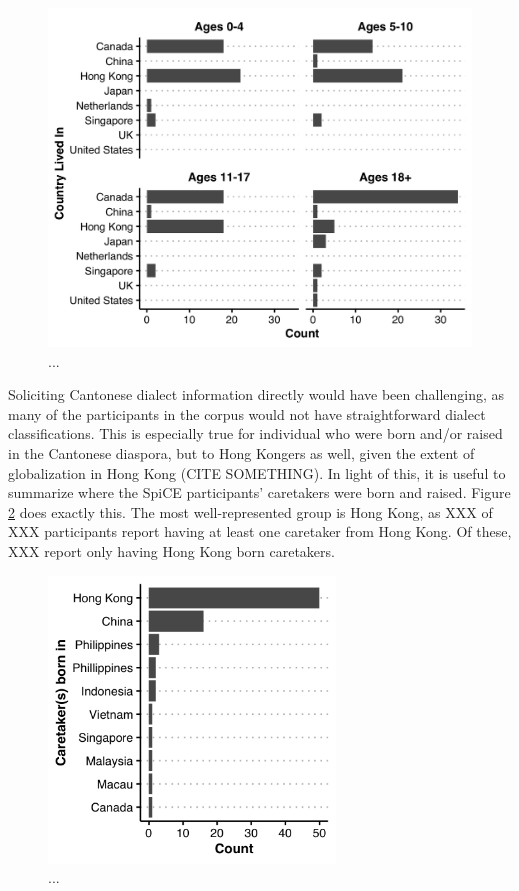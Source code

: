 \begin{figure}[!htbp]
  \begin{center}
  \includegraphics[width=5in]{figures/ch2_placeslived_5in.png} 
  \caption{...}
  \label{ch2:fig:placeslived}
  \end{center}
\end{figure}

Soliciting Cantonese dialect information directly would have been challenging, as many of the participants in the corpus would not have straightforward dialect classifications. This is especially true for individual who were born and/or raised in the Cantonese diaspora, but to Hong Kongers as well, given the extent of globalization in Hong Kong (CITE SOMETHING). In light of this, it is useful to summarize where the SpiCE participants' caretakers were born and raised. Figure \ref{ch2:fig:caretakers} does exactly this. The most well-represented group is Hong Kong, as XXX of XXX participants report having at least one caretaker from Hong Kong. Of these, XXX report only having Hong Kong born caretakers.

\begin{figure}[!htbp]
  \begin{center}
  \includegraphics[width=3in]{figures/ch2_caretakers_3in.png} 
  \caption{...}
  \label{ch2:fig:caretakers}
  \end{center}
\end{figure}

